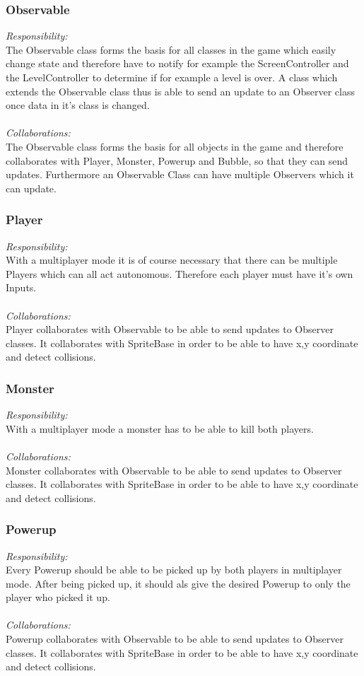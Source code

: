\subsubsection{Observable}
\textit{Responsibility:} \\
The Observable class forms the basis for all classes in the game which easily change state and therefore have to notify for example the ScreenController and the LevelController to determine if for example a level is over. A class which extends the Observable class thus is able to send an update to an Observer class once data in it's class is changed. \\ \\
\textit{Collaborations:} \\
The Observable class forms the basis for all objects in the game and therefore collaborates with Player, Monster, Powerup and Bubble, so that they can send updates. Furthermore an Observable Class can have multiple Observers which it can update. 

\subsubsection{Player}
\textit{Responsibility:} \\
With a multiplayer mode it is of course necessary that there can be multiple Players which can all act autonomous. Therefore each player must have it's own Inputs. \\ \\
\textit{Collaborations:} \\
Player collaborates with Observable to be able to send updates to Observer classes. It collaborates with SpriteBase in order to be able to have x,y coordinate and detect collisions.   

\subsubsection{Monster}
\textit{Responsibility:} \\
With a multiplayer mode a monster has to be able to kill both players. \\ \\
\textit{Collaborations:} \\
Monster collaborates with Observable to be able to send updates to Observer classes. It collaborates with SpriteBase in order to be able to have x,y coordinate and detect collisions. 

\subsubsection{Powerup}
\textit{Responsibility:} \\
Every Powerup should be able to be picked up by both players in multiplayer mode. After being picked up, it should als give the desired Powerup to only the player who picked it up. \\ \\
\textit{Collaborations:} \\
Powerup collaborates with Observable to be able to send updates to Observer classes. It collaborates with SpriteBase in order to be able to have x,y coordinate and detect collisions. 

